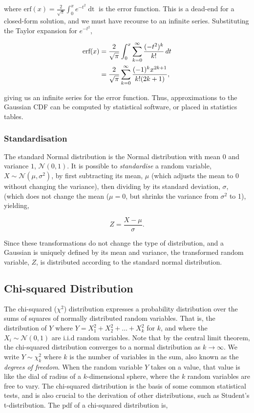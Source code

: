 \documentclass[11pt]{amsart}
\begin{document}
where $\text{erf}(x) = \frac{2}{\sqrt{\pi}}\int_{0}^{x}e^{-t^2}\mathop{dt}$ is the error function. This is a dead-end for a closed-form solution, and we must have recourse to an infinite series. Substituting the Taylor expansion for $e^{-t^2}$,

\begin{align}
\text{erf}(x) &= \frac{2}{\sqrt{\pi}}\int_{0}^{x} \sum_{k=0}^{\infty} \frac{(-t^2)^k}{k!} \mathop{dt} \notag \\
&= \frac{2}{\sqrt{\pi}}\sum_{k=0}^{\infty} \frac{(-1)^kx^{2k + 1}}{k!(2k + 1)}, \notag
\end{align}

giving us an infinite series for the error function. Thus, approximations to the Gaussian CDF can be computed by statistical software, or placed in statistics tables.

\subsubsection{Standardisation}

The standard Normal distribution is the Normal distribution with mean $0$ and variance $1$, $\mathcal{N}(0, 1)$. It is possible to \emph{standardise} a random variable, $X \sim \mathcal{N}(\mu, \sigma^2)$, by first subtracting its mean, $\mu$ (which adjusts the mean to 0 without changing the variance), then dividing by its standard deviation, $\sigma$, (which does not change the mean ($\mu = 0$, but shrinks the variance from $\sigma^2$ to 1), yielding,

$$Z = \frac{X - \mu}{\sigma}.$$

Since these transformations do not change the type of distribution, and a Gaussian is uniquely defined by its mean and variance, the transformed random variable, $Z$, is distributed according to the standard normal distribution.

\subsection{Chi-squared Distribution}

The chi-squared ($\chi^2$) distribution expresses a probability distribution over the sums of squares of normally distributed random variables. That is, the distribution of $Y$ where $Y = X_1^2 + X_2^2 + \dots + X_k^2$ for $k$, and where the $X_i \sim \mathcal{N}(0, 1)$ are i.i.d random variables. Note that by the central limit theorem, the chi-squared distribution converges to a normal distribution as $k \to \infty$. We write $Y \sim \chi^2_k$ where $k$ is the number of variables in the sum, also known as the \emph{degrees of freedom}. When the random variable $Y$ takes on a value, that value is like the dial of radius of a $k$-dimensional sphere, where the $k$ random variables are free to vary. The chi-squared distribution is the basis of some common statistical tests, and is also crucial to the derivation of other distributions, such as Student's t-distribution. The pdf of a chi-squared distribution is,
\end{document}
